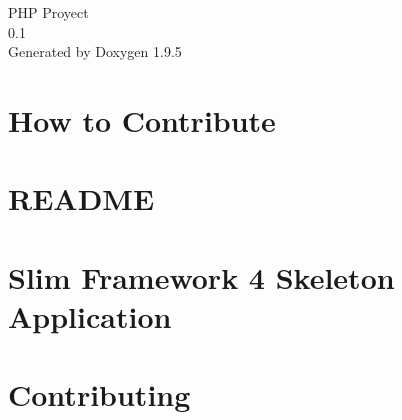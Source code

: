 \documentclass[twoside]{book}
\newcommand{\+}{\discretionary{\mbox{\scriptsize$\hookleftarrow$}}{}{}}
\newcommand{\clearemptydoublepage}{%
    \newpage{\pagestyle{empty}\cleardoublepage}%
  }
\begin{document}
  \raggedbottom
    \hypersetup{pageanchor=false,
                bookmarksnumbered=true,
                pdfencoding=unicode
               }
  \begin{titlepage}
  \vspace*{7cm}
  \begin{center}%
  {\Large PHP Proyect}\\
  [1ex]\large 0.\+1 \\
  \vspace*{1cm}
  {\large Generated by Doxygen 1.9.5}\\
  \end{center}
  \end{titlepage}
  \clearemptydoublepage
  \tableofcontents
  \clearemptydoublepage
  \hypersetup{pageanchor=true}
\chapter{How to Contribute}
\label{md__c__workspace__proyecto__p_h_p_project__c_o_n_t_r_i_b_u_t_i_n_g}

\chapter{README}
\label{md__c__workspace__proyecto__p_h_p_project_logs__r_e_a_d_m_e}

\chapter{Slim Framework 4 Skeleton Application}
\label{md__c__workspace__proyecto__p_h_p_project__r_e_a_d_m_e}

\chapter{Contributing}
\label{md__c__workspace__proyecto__p_h_p_project_vendor_doctrine_instantiator__c_o_n_t_r_i_b_u_t_i_n_g}

\end{document}
